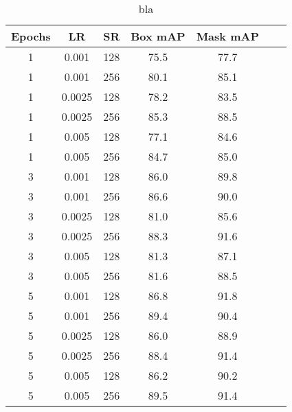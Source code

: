 \begin{table}
	\centering
	\caption[Detection evaluation]{bla}
	\label{tab:detection_eval3}
	\begin{tabular}[H!]{ccccccc}
		\toprule
		\textbf{Epochs} & \textbf{LR} & \textbf{SR} & \textbf{Box mAP} & \textbf{Mask mAP} \\
		\midrule
		1               & 0.001       & 128         & 75.5             & 77.7              \\
		1               & 0.001       & 256         & 80.1             & 85.1              \\
		1               & 0.0025      & 128         & 78.2             & 83.5              \\
		1               & 0.0025      & 256         & 85.3             & 88.5              \\
		1               & 0.005       & 128         & 77.1             & 84.6              \\
		1               & 0.005       & 256         & 84.7             & 85.0              \\
		3               & 0.001       & 128         & 86.0             & 89.8              \\
		3               & 0.001       & 256         & 86.6             & 90.0              \\
		3               & 0.0025      & 128         & 81.0             & 85.6              \\
		3               & 0.0025      & 256         & 88.3             & 91.6              \\
		3               & 0.005       & 128         & 81.3             & 87.1              \\
		3               & 0.005       & 256         & 81.6             & 88.5              \\
		5               & 0.001       & 128         & 86.8             & 91.8              \\
		5               & 0.001       & 256         & 89.4             & 90.4              \\
		5               & 0.0025      & 128         & 86.0             & 88.9              \\
		5               & 0.0025      & 256         & 88.4             & 91.4              \\
		5               & 0.005       & 128         & 86.2             & 90.2              \\
		5               & 0.005       & 256         & 89.5             & 91.4              \\
		\bottomrule
	\end{tabular}
\end{table}



